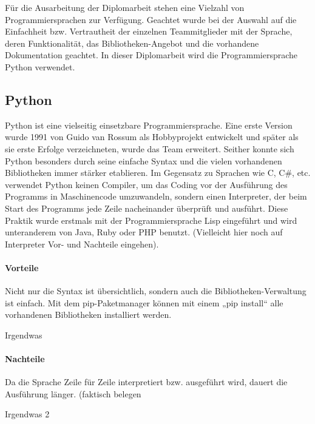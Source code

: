 Für die Ausarbeitung der Diplomarbeit stehen eine Vielzahl von Programmiersprachen zur Verfügung. Geachtet wurde bei der Auswahl auf die Einfachheit bzw. Vertrautheit der einzelnen Teammitglieder mit der Sprache, deren Funktionalität, das Bibliotheken-Angebot und die vorhandene Dokumentation geachtet. In dieser Diplomarbeit wird die Programmiersprache Python verwendet. 

\subsection{Python}
Python ist eine vielseitig einsetzbare Programmiersprache. Eine erste Version wurde 1991 von Guido van Rossum als Hobbyprojekt entwickelt und später als sie erste Erfolge verzeichneten, wurde das Team erweitert. Seither konnte sich Python besonders durch seine einfache Syntax und die vielen vorhandenen Bibliotheken immer stärker etablieren. Im Gegensatz zu Sprachen wie C, C\#, etc. verwendet Python keinen Compiler, um das Coding vor der Ausführung des Programms in Maschinencode umzuwandeln, sondern einen Interpreter, der beim Start des Programms jede Zeile nacheinander überprüft und ausführt. Diese Praktik wurde erstmals mit der Programmiersprache Lisp eingeführt und wird unteranderem von Java, Ruby oder PHP benutzt. (Vielleicht hier noch auf Interpreter Vor- und Nachteile eingehen). 

\paragraph{Vorteile}
\begin{list}{}{}
	\item Nicht nur die Syntax ist übersichtlich, sondern auch die Bibliotheken-Verwaltung ist einfach. Mit dem pip-Paketmanager können mit einem „pip install“ alle vorhandenen Bibliotheken installiert werden.
	\item Irgendwas
\end{list}


\paragraph{Nachteile}
\begin{list}{}{}
	\item Da die Sprache Zeile für Zeile interpretiert bzw. ausgeführt wird, dauert die Ausführung länger. (faktisch belegen
	\item Irgendwas 2
\end{list}

